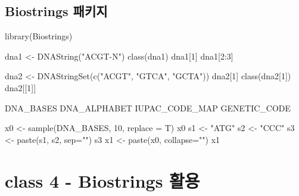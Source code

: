 \documentclass[
]{book}
\newenvironment{Shaded}{\begin{snugshade}}{\end{snugshade}}
\newcommand{\AttributeTok}[1]{\textcolor[rgb]{0.77,0.63,0.00}{#1}}
\newcommand{\DecValTok}[1]{\textcolor[rgb]{0.00,0.00,0.81}{#1}}
\newcommand{\FunctionTok}[1]{\textcolor[rgb]{0.00,0.00,0.00}{#1}}
\newcommand{\NormalTok}[1]{#1}
\newcommand{\OtherTok}[1]{\textcolor[rgb]{0.56,0.35,0.01}{#1}}
\newcommand{\SpecialCharTok}[1]{\textcolor[rgb]{0.00,0.00,0.00}{#1}}
\newcommand{\StringTok}[1]{\textcolor[rgb]{0.31,0.60,0.02}{#1}}
\begin{document}
\hypertarget{day2_class3_biostrings}{%
\subsection{Biostrings 패키지}\label{day2_class3_biostrings}}

\begin{Shaded}
\begin{Highlighting}[]
\FunctionTok{library}\NormalTok{(Biostrings)}

\NormalTok{dna1 }\OtherTok{\textless{}{-}} \FunctionTok{DNAString}\NormalTok{(}\StringTok{"ACGT{-}N"}\NormalTok{)}
\FunctionTok{class}\NormalTok{(dna1)}
\NormalTok{dna1[}\DecValTok{1}\NormalTok{]}
\NormalTok{dna1[}\DecValTok{2}\SpecialCharTok{:}\DecValTok{3}\NormalTok{]}

\NormalTok{dna2 }\OtherTok{\textless{}{-}} \FunctionTok{DNAStringSet}\NormalTok{(}\FunctionTok{c}\NormalTok{(}\StringTok{"ACGT"}\NormalTok{, }\StringTok{"GTCA"}\NormalTok{, }\StringTok{"GCTA"}\NormalTok{))}
\NormalTok{dna2[}\DecValTok{1}\NormalTok{]}
\FunctionTok{class}\NormalTok{(dna2[}\DecValTok{1}\NormalTok{])}
\NormalTok{dna2[[}\DecValTok{1}\NormalTok{]]}
\end{Highlighting}
\end{Shaded}

\begin{Shaded}
\begin{Highlighting}[]
\NormalTok{DNA\_BASES}
\NormalTok{DNA\_ALPHABET}
\NormalTok{IUPAC\_CODE\_MAP}
\NormalTok{GENETIC\_CODE}
\end{Highlighting}
\end{Shaded}

\begin{Shaded}
\begin{Highlighting}[]
\NormalTok{x0 }\OtherTok{\textless{}{-}} \FunctionTok{sample}\NormalTok{(DNA\_BASES, }\DecValTok{10}\NormalTok{, }\AttributeTok{replace =}\NormalTok{ T)}
\NormalTok{x0}
\NormalTok{s1 }\OtherTok{\textless{}{-}} \StringTok{"ATG"}
\NormalTok{s2 }\OtherTok{\textless{}{-}} \StringTok{"CCC"}
\NormalTok{s3 }\OtherTok{\textless{}{-}} \FunctionTok{paste}\NormalTok{(s1, s2, }\AttributeTok{sep=}\StringTok{""}\NormalTok{)}
\NormalTok{s3}
\NormalTok{x1 }\OtherTok{\textless{}{-}} \FunctionTok{paste}\NormalTok{(x0, }\AttributeTok{collapse=}\StringTok{""}\NormalTok{)}
\NormalTok{x1}
\end{Highlighting}
\end{Shaded}

\hypertarget{day2_class4_frequency}{%
\section{class 4 - Biostrings 활용}\label{day2_class4_frequency}}
\end{document}
